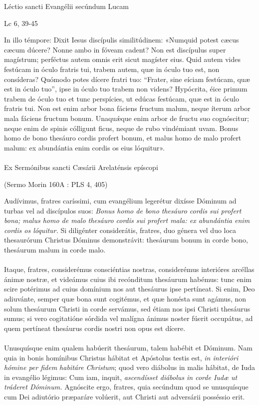\documentclass[options]{article}
\begin{document}
	Léctio sancti Evangélii secúndum Lucam 
\begin{flushright}
Lc 6, 39-45	
\end{flushright}
	In illo témpore:
	Dixit Iesus discípulis similitúdinem: «Numquid potest cæcus cæcum dúcere? Nonne ambo in fóveam cadent?
	Non est discípulus super magístrum; perféctus autem omnis erit sicut magíster eius.
	Quid autem vides festúcam in óculo fratris tui, trabem autem, quæ in óculo tuo est, non consíderas? Quómodo potes dícere fratri tuo: “Frater, sine eíciam festúcam, quæ est in óculo tuo”, ipse in óculo tuo trabem non videns? Hypócrita, éice primum trabem de óculo tuo et tunc perspícies, ut edúcas festúcam, quæ est in óculo fratris tui.
	Non est enim arbor bona fáciens fructum malum, neque íterum arbor mala fáciens fructum bonum. Unaqu\'{æ}que enim arbor de fructu suo cognóscitur; neque enim de spinis cólligunt ficus, neque de rubo vindémiant uvam. Bonus homo de bono thesáuro cordis profert bonum, et malus homo de malo profert malum: ex abundántia enim cordis os eius lóquitur».\\
	\\
	Ex Sermónibus sancti Cæsárii Arelaténsis epíscopi
	\begin{flushright}
	(Sermo Morin 160A : PLS 4, 405)	
	\end{flushright}
	Audívimus, fratres caríssimi, cum evangélium legerétur dixísse Dóminum ad turbas vel ad discípulos suos: \emph{Bonus homo de bono thesáuro cordis sui profert bona; malus homo de malo thesáuro cordis sui profert mala: ex abundántia enim cordis os lóquitur.} Si diligénter considerátis, fratres, duo génera vel duo loca thesaurórum Christus Dóminus demonstrávit: thesáurum bonum in corde bono, thesáurum malum in corde malo.\\
	\\
	Itaque, fratres, considerémus consciéntias nostras, considerémus interióres arcéllas ánimæ nostræ, et videámus cuius ibi recónditum thesáurum habémus: tunc enim scire potérimus ad cuius domínium nos aut thesáurus ipse pertíneat. Si enim, Deo adiuvánte, semper quæ bona sunt cogitémus, et quæ honésta sunt agámus, non solum thesáurum Christi in corde servámus, sed étiam nos ipsi Christi thesáurus sumus; si vero cogitatióne sórdida vel malígna ánimus noster fúerit occupátus, ad quem pertíneat thesáurus cordis nostri non opus est dícere.\\
	\\
	Unusquísque enim qualem habúerit thesáurum, talem habébit et Dóminum. Nam quia in bonis homínibus Christus hábitat et Apóstolus testis est, \emph{in interióri hómine per fidem habitáre Christum}; quod vero diábolus in malis hábitat, de Iuda in evangélio légimus: Cum iam, inquit, \emph{ascendísset diábolus in corde Iudæ ut tráderet Dóminum.} Agnóscite ergo, fratres, quia secúndum quod se unusquísque cum Dei adiutório præparáre volúerit, aut Christi aut adversárii posséssio erit.\\
\end{document}
